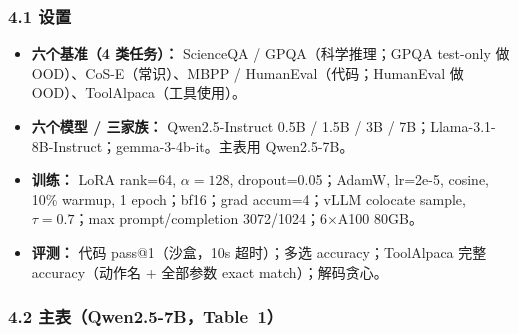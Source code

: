 \subsubsection{4.1 设置}

\begin{itemize}[leftmargin=1.5em]
  \item \textbf{六个基准（4 类任务）：} ScienceQA / GPQA（科学推理；GPQA test-only 做 OOD）、CoS-E（常识）、MBPP / HumanEval（代码；HumanEval 做 OOD）、ToolAlpaca（工具使用）。
  \item \textbf{六个模型 / 三家族：} Qwen2.5-Instruct 0.5B / 1.5B / 3B / 7B；Llama-3.1-8B-Instruct；gemma-3-4b-it。主表用 Qwen2.5-7B。
  \item \textbf{训练：} LoRA rank=64, $\alpha=128$, dropout=0.05；AdamW, lr=2e-5, cosine, 10\% warmup, 1 epoch；bf16；grad accum=4；vLLM colocate sample, $\tau=0.7$；max prompt/completion 3072/1024；6$\times$A100 80GB。
  \item \textbf{评测：} 代码 pass@1（沙盒，10s 超时）；多选 accuracy；ToolAlpaca 完整 accuracy（动作名 + 全部参数 exact match）；解码贪心。
\end{itemize}

\subsubsection{4.2 主表（Qwen2.5-7B，Table~1）}

